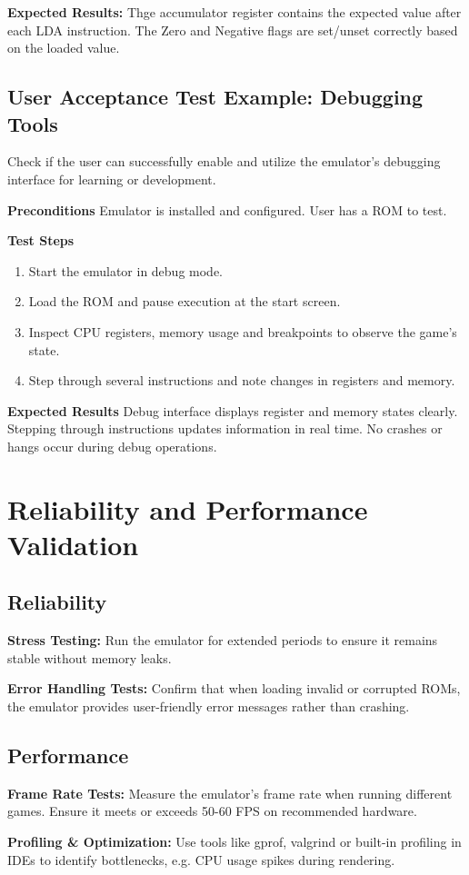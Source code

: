 \documentclass[a4paper, 11pt]{article}
\begin{document}
\textbf{Expected Results:}
Thge accumulator register contains the expected value after each LDA instruction. The Zero and Negative flags are set/unset correctly based on the loaded value.

\subsection{User Acceptance Test Example: Debugging Tools}
Check if the user can successfully enable and utilize the emulator's debugging interface for learning or development.

\textbf{Preconditions}
Emulator is installed and configured. User has a ROM to test.

\textbf{Test Steps}
\begin{enumerate}
    \item Start the emulator in debug mode.
    \item Load the ROM and pause execution at the start screen.
    \item Inspect CPU registers, memory usage and breakpoints to observe the game's state.
    \item Step through several instructions and note changes in registers and memory.
\end{enumerate}

\textbf{Expected Results}
Debug interface displays register and memory states clearly. Stepping through instructions updates information in real time. No crashes or hangs occur during debug operations.

\section{Reliability and Performance Validation}

\subsection{Reliability}
\textbf{Stress Testing:} Run the emulator for extended periods to ensure it remains stable without memory leaks.

\textbf{Error Handling Tests:} Confirm that when loading invalid or corrupted ROMs, the emulator provides user-friendly error messages rather than crashing.

\subsection{Performance}
\textbf{Frame Rate Tests:} Measure the emulator's frame rate when running different games. Ensure it meets or exceeds 50-60 FPS on recommended hardware.

\textbf{Profiling \& Optimization:} Use tools like gprof, valgrind or built-in profiling in IDEs to identify bottlenecks, e.g. CPU usage spikes during rendering.
\end{document}
